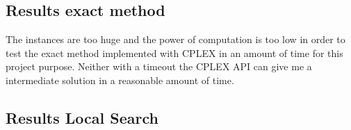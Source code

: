 	
	
	\subsection{Results exact method}
		The instances are too huge and the power of computation is too low in order to test the exact method implemented with CPLEX in an amount of time for this project purpose. Neither with a timeout the CPLEX API can give me a intermediate solution in a reasonable amount of time.
		
	\newpage
	
	\subsection{Results Local Search}
	
	
	
		
		
	